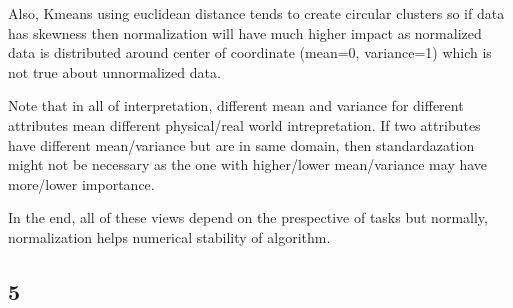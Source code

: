 \documentclass[11pt]{article}
\begin{document}
Also, Kmeans using euclidean distance tends to create circular clusters
so if data has skewness then normalization will have much higher impact
as normalized data is distributed around center of coordinate (mean=0,
variance=1) which is not true about unnormalized data.

Note that in all of interpretation, different mean and variance for
different attributes mean different physical/real world intrepretation.
If two attributes have different mean/variance but are in same domain,
then standardazation might not be necessary as the one with higher/lower
mean/variance may have more/lower importance.

In the end, all of these views depend on the prespective of tasks but
normally, normalization helps numerical stability of algorithm.

    \hypertarget{section}{%
\subsection{5}\label{section}}
\end{document}
